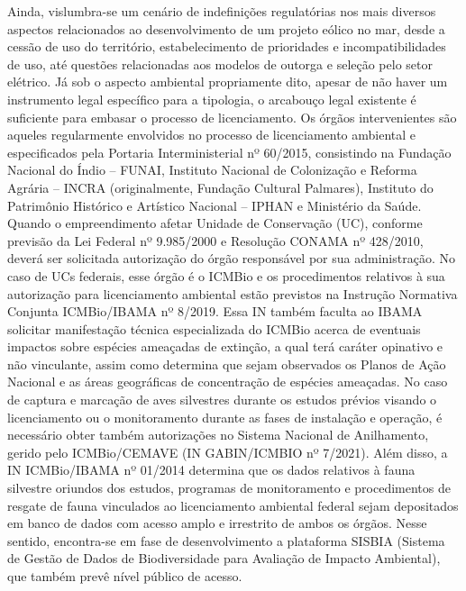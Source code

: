 \documentclass[
  oneside]{scrbook}
\begin{document}
Ainda, vislumbra-se um cenário de indefinições regulatórias nos mais diversos aspectos relacionados ao desenvolvimento de um projeto eólico no mar, desde a cessão de uso do território, estabelecimento de prioridades e incompatibilidades de uso, até questões relacionadas aos modelos de outorga e seleção pelo setor elétrico. Já sob o aspecto ambiental propriamente dito, apesar de não haver um instrumento legal específico para a tipologia, o arcabouço legal existente é suficiente para embasar o processo de licenciamento. Os órgãos intervenientes são aqueles regularmente envolvidos no processo de licenciamento ambiental e especificados pela Portaria Interministerial nº 60/2015, consistindo na Fundação Nacional do Índio -- FUNAI, Instituto Nacional de Colonização e Reforma Agrária -- INCRA (originalmente, Fundação Cultural Palmares), Instituto do Patrimônio Histórico e Artístico Nacional -- IPHAN e Ministério da Saúde. Quando o empreendimento afetar Unidade de Conservação (UC), conforme previsão da Lei Federal nº 9.985/2000 e Resolução CONAMA nº 428/2010, deverá ser solicitada autorização do órgão responsável por sua administração. No caso de UCs federais, esse órgão é o ICMBio e os procedimentos relativos à sua autorização para licenciamento ambiental estão previstos na Instrução Normativa Conjunta ICMBio/IBAMA nº 8/2019. Essa IN também faculta ao IBAMA solicitar manifestação técnica especializada do ICMBio acerca de eventuais impactos sobre espécies ameaçadas de extinção, a qual terá caráter opinativo e não vinculante, assim como determina que sejam observados os Planos de Ação Nacional e as áreas geográficas de concentração de espécies ameaçadas. No caso de captura e marcação de aves silvestres durante os estudos prévios visando o licenciamento ou o monitoramento durante as fases de instalação e operação, é necessário obter também autorizações no Sistema Nacional de Anilhamento, gerido pelo ICMBio/CEMAVE (IN GABIN/ICMBIO nº 7/2021). Além disso, a IN ICMBio/IBAMA nº 01/2014 determina que os dados relativos à fauna silvestre oriundos dos estudos, programas de monitoramento e procedimentos de resgate de fauna vinculados ao licenciamento ambiental federal sejam depositados em banco de dados com acesso amplo e irrestrito de ambos os órgãos. Nesse sentido, encontra-se em fase de desenvolvimento a plataforma SISBIA (Sistema de Gestão de Dados de Biodiversidade para Avaliação de Impacto Ambiental), que também prevê nível público de acesso.
\end{document}
